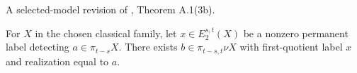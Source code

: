 \begin{theorem}
\label{frontier:Literature:acb86a0972cf}
A selected-model revision of \cite{BHS}, Theorem A.1(3b).\par

For $X$ in the chosen classical family, let $x\in E_2^{s,t}(X)$ be a nonzero permanent label detecting $a\in\pi_{t-s}X$. There exists $b\in\pi_{t-s,t}\nu X$ with first-quotient label $x$ and realization equal to $a$.
\end{theorem}

